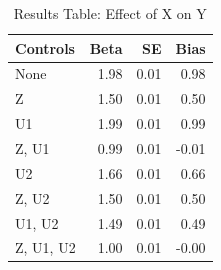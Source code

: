 \begin{table}[ht]
\centering
\begin{tabular}{lrrr}
  \hline
Controls & Beta & SE & Bias \\ 
  \hline
None & 1.98 & 0.01 & 0.98 \\ 
  Z & 1.50 & 0.01 & 0.50 \\ 
  U1 & 1.99 & 0.01 & 0.99 \\ 
  Z, U1 & 0.99 & 0.01 & -0.01 \\ 
  U2 & 1.66 & 0.01 & 0.66 \\ 
  Z, U2 & 1.50 & 0.01 & 0.50 \\ 
  U1, U2 & 1.49 & 0.01 & 0.49 \\ 
  Z, U1, U2 & 1.00 & 0.01 & -0.00 \\ 
   \hline
\end{tabular}
\caption{Results Table: Effect of X on Y} 
\label{tab:part3_results}
\end{table}
